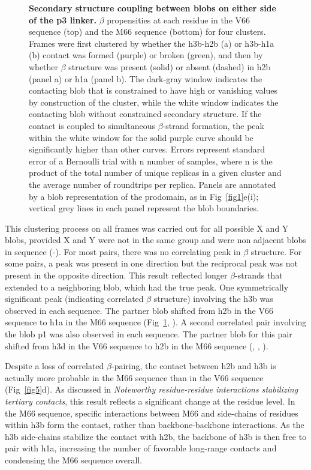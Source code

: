 \documentclass[10pt,letterpaper]{article}
\begin{document}
\begin{figure}[!ht]
\caption{{\bf Secondary structure coupling between blobs on either side of the p3 linker.} $\beta$ propensities at each residue in the V66 sequence (top) and the M66 sequence (bottom) for four clusters. Frames were first clustered by whether the h3b-h2b (a) or h3b-h1a (b) contact was formed (purple) or broken (green), and then by whether $\beta$ structure was present (solid) or absent (dashed) in h2b (panel a) or h1a (panel b). The dark-gray window indicates the contacting blob that is constrained to have high or vanishing values by construction of the cluster, while the white window indicates the contacting blob without constrained secondary structure. If the contact is coupled to simultaneous $\beta$-strand formation, the peak within the white window for the solid purple curve should be significantly higher than other curves. Errors represent standard error of a Bernoulli trial with n number of samples, where n is the product of the total number of unique replicas in a given cluster and the average number of roundtrips per replica. Panels are annotated by a blob representation of the prodomain, as in Fig~\ref{fig1}e(i); vertical grey lines in each panel represent the blob boundaries. }
\label{fig6}
\end{figure}

This clustering process on all frames was carried out for all possible X and Y blobs, provided X and Y were not in the same group and were non adjacent blobs in sequence (-). For most pairs, there was no correlating peak in $\beta$ structure. For some pairs, a peak was present in one direction but the reciprocal peak was not present in the opposite direction. This result reflected longer $\beta$-strands that extended to a neighboring blob, which had the true peak. One symmetrically significant peak (indicating correlated $\beta$ structure) involving the h3b was observed in each sequence. The partner blob shifted from h2b in the V66 sequence to h1a in the M66 sequence (Fig~\ref{fig6}, ). A second correlated pair involving the blob p1 was also observed in each sequence. The partner blob for this pair shifted from h3d in the V66 sequence to h2b in the M66 sequence (, , ). 

Despite a loss of correlated $\beta$-pairing, the contact between h2b and h3b is actually more probable in the M66 sequence than in the V66 sequence (Fig~\ref{fig5}d). As discussed in \emph{Noteworthy residue-residue interactions stabilizing tertiary contacts}, this result reflects a significant change at the residue level. In the M66 sequence, specific interactions between M66 and side-chains of residues within h3b form the contact, rather than backbone-backbone interactions. As the h3b side-chains stabilize the contact with h2b, the backbone of h3b is then free to pair with h1a, increasing the number of favorable long-range contacts and condensing the M66 sequence overall.
\end{document}
